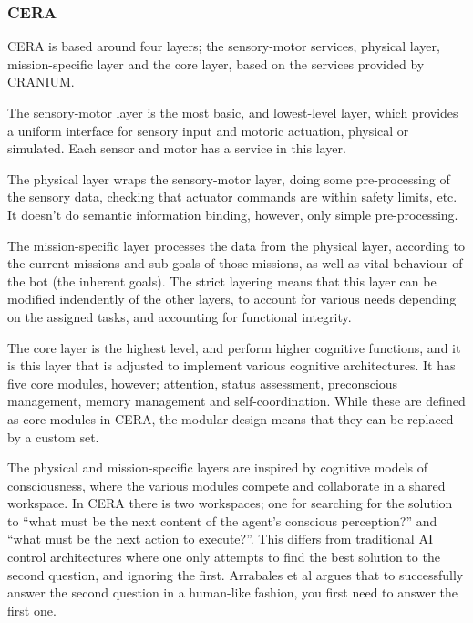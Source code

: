 \subsubsection{CERA}
CERA is based around four layers; the sensory-motor services, physical layer,
mission-specific layer and the core layer, based on the services provided by
CRANIUM.

The sensory-motor layer is the most basic, and lowest-level layer, which
provides a uniform interface for sensory input and motoric actuation, physical
or simulated. Each sensor and motor has a service in this layer.

The physical layer wraps the sensory-motor layer, doing some pre-processing of
the sensory data, checking that actuator commands are within safety limits,
etc. It doesn't do semantic information binding, however, only simple
pre-processing.

The mission-specific layer processes the data from the physical layer,
according to the current missions and sub-goals of those missions, as well as
vital behaviour of the bot (the inherent goals). The strict layering means that
this layer can be modified indendently of the other layers, to account for
various needs depending on the assigned tasks, and accounting for functional
integrity.

The core layer is the highest level, and perform higher cognitive functions,
and it is this layer that is adjusted to implement various cognitive
architectures. It has five core modules, however; attention, status assessment,
preconscious management, memory management and self-coordination. While these
are defined as core modules in CERA, the modular design means that they can be
replaced by a custom set.

The physical and mission-specific layers are inspired by cognitive models of
consciousness, where the various modules compete and collaborate in a shared
workspace. In CERA there is two workspaces; one for searching for the solution
to ``what must be the next content of the agent's conscious perception?'' and
``what must be the next action to execute?''. This differs from traditional AI
control architectures where one only attempts to find the best solution to the
second question, and ignoring the first. Arrabales et al
\cite{arrabales2009ceracranium} argues that to successfully answer the second
question in a human-like fashion, you first need to answer the first one.

